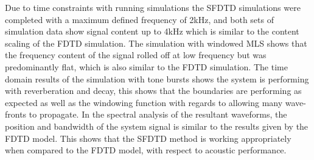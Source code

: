 Due to time constraints with running simulations the SFDTD simulations were completed with a maximum defined frequency of 2kHz, and both sets of simulation data show signal content up to 4kHz which is similar to the content scaling of the FDTD simulation. The simulation with windowed  MLS shows that the frequency content of the signal rolled off at low frequency but was predominantly flat, which is also similar to the FDTD simulation. The time domain results of the simulation with tone bursts shows the system is performing with reverberation and decay, this shows that the boundaries are performing as expected as well as the windowing function with regards to allowing many wave-fronts to propagate. In the spectral analysis of the resultant waveforms, the position and bandwidth of the system signal is similar to the results given by the FDTD model. This shows that the SFDTD method is working appropriately when compared to the FDTD model, with respect to acoustic performance.

